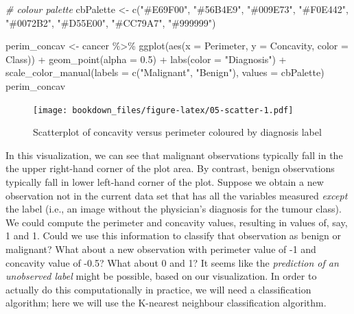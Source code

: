 \documentclass[
]{krantz}
\makeatletter
\newenvironment{Shaded}{\begin{snugshade}}{\end{snugshade}}
\newcommand{\AttributeTok}[1]{\textcolor[rgb]{0.61,0.61,0.61}{#1}}
\newcommand{\CommentTok}[1]{\textcolor[rgb]{0.37,0.37,0.37}{\textit{#1}}}
\newcommand{\FloatTok}[1]{\textcolor[rgb]{0.06,0.06,0.06}{#1}}
\newcommand{\FunctionTok}[1]{\textcolor[rgb]{0,0,0}{#1}}
\newcommand{\NormalTok}[1]{#1}
\newcommand{\OtherTok}[1]{\textcolor[rgb]{0.37,0.37,0.37}{#1}}
\newcommand{\SpecialCharTok}[1]{\textcolor[rgb]{0,0,0}{#1}}
\newcommand{\StringTok}[1]{\textcolor[rgb]{0.5,0.5,0.5}{#1}}
\newenvironment{kframe}{%
\medskip{}
\setlength{\fboxsep}{.8em}
 \def\at@end@of@kframe{}%
 \ifinner\ifhmode%
  \def\at@end@of@kframe{\end{minipage}}%
  \begin{minipage}{\columnwidth}%
 \fi\fi%
 \def\FrameCommand##1{\hskip\@totalleftmargin \hskip-\fboxsep
 \colorbox{shadecolor}{##1}\hskip-\fboxsep
     \hskip-\linewidth \hskip-\@totalleftmargin \hskip\columnwidth}%
 \MakeFramed {\advance\hsize-\width
   \@totalleftmargin\z@ \linewidth\hsize
   \@setminipage}}%
 {\par\unskip\endMakeFramed%
 \at@end@of@kframe}
\renewenvironment{Shaded}{\begin{kframe}}{\end{kframe}}
\makeatother
\begin{document}
\begin{Shaded}
\begin{Highlighting}[]
\CommentTok{\# colour palette}
\NormalTok{cbPalette }\OtherTok{\textless{}{-}} \FunctionTok{c}\NormalTok{(}\StringTok{"\#E69F00"}\NormalTok{, }\StringTok{"\#56B4E9"}\NormalTok{, }\StringTok{"\#009E73"}\NormalTok{, }\StringTok{"\#F0E442"}\NormalTok{, }\StringTok{"\#0072B2"}\NormalTok{, }\StringTok{"\#D55E00"}\NormalTok{, }\StringTok{"\#CC79A7"}\NormalTok{, }\StringTok{"\#999999"}\NormalTok{)}

\NormalTok{perim\_concav }\OtherTok{\textless{}{-}}\NormalTok{ cancer }\SpecialCharTok{\%\textgreater{}\%}
  \FunctionTok{ggplot}\NormalTok{(}\FunctionTok{aes}\NormalTok{(}\AttributeTok{x =}\NormalTok{ Perimeter, }\AttributeTok{y =}\NormalTok{ Concavity, }\AttributeTok{color =}\NormalTok{ Class)) }\SpecialCharTok{+}
  \FunctionTok{geom\_point}\NormalTok{(}\AttributeTok{alpha =} \FloatTok{0.5}\NormalTok{) }\SpecialCharTok{+}
  \FunctionTok{labs}\NormalTok{(}\AttributeTok{color =} \StringTok{"Diagnosis"}\NormalTok{) }\SpecialCharTok{+}
  \FunctionTok{scale\_color\_manual}\NormalTok{(}\AttributeTok{labels =} \FunctionTok{c}\NormalTok{(}\StringTok{"Malignant"}\NormalTok{, }\StringTok{"Benign"}\NormalTok{), }\AttributeTok{values =}\NormalTok{ cbPalette)}
\NormalTok{perim\_concav}
\end{Highlighting}
\end{Shaded}

\begin{figure}
\centering
\texttt{[image: bookdown\_files/figure-latex/05-scatter-1.pdf]}
\caption{\label{fig:05-scatter}Scatterplot of concavity versus perimeter coloured by diagnosis label}
\end{figure}

In this visualization, we can see that malignant observations typically fall in
the the upper right-hand corner of the plot area. By contrast, benign
observations typically fall in lower left-hand corner of the plot. Suppose we
obtain a new observation not in the current data set that has all the variables
measured \emph{except} the label (i.e., an image without the physician's diagnosis
for the tumour class). We could compute the perimeter and concavity values,
resulting in values of, say, 1 and 1. Could we use this information to classify
that observation as benign or malignant? What about a new observation with
perimeter value of -1 and concavity value of -0.5? What about 0 and 1? It seems
like the \emph{prediction of an unobserved label} might be possible, based on our
visualization. In order to actually do this computationally in practice, we
will need a classification algorithm; here we will use the K-nearest neighbour
classification algorithm.
\end{document}
